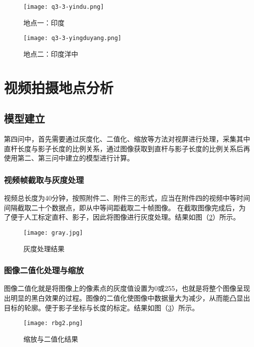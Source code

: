\documentclass[withoutpreface,bwprint]{cumcmthesis} %
\begin{document}
\begin{figure}[!htbp]  
\begin{minipage}[t]{0.5\textwidth}
\centering  
\texttt{[image: q3-3-yindu.png]}
\caption{地点一：印度} \label{fig:q3-3-yindu}\end{minipage}
\hspace{1ex}
\begin{minipage}[t]{0.5\textwidth}  
\centering  
\texttt{[image: q3-3-yingduyang.png]}
\caption{地点二：印度洋中} \label{fig:q3-3-yingduyang}
\end{minipage}  
\end{figure} 




\newpage
\section{视频拍摄地点分析}
\subsection{模型建立}
第四问中，首先需要通过灰度化、二值化、缩放等方法对视屏进行处理，采集其中直杆长度与影子长度的比例关系，通过图像获取到直杆与影子长度的比例关系后再使用第二、第三问中建立的模型进行计算。
\subsubsection{视频帧截取与灰度处理}
视频总长度为40分钟，按照附件二、附件三的形式，应当在附件四的视频中等时间间隔截取二十个数据点，即从中等间距截取二十帧图像。
在截取图像完成后，为了便于人工标定直杆、影子，因此将图像进行灰度处理。结果如图（\ref{fig:gray}）所示。

\begin{figure}[h]
\small
\centering
\texttt{[image: gray.jpg]}
\caption{灰度处理结果} \label{fig:gray}
\end{figure}
\subsubsection{图像二值化处理与缩放}
图像二值化就是将图像上的像素点的灰度值设置为0或255，也就是将整个图像呈现出明显的黑白效果的过程。图像的二值化使图像中数据量大为减少，从而能凸显出目标的轮廓。便于影子坐标与长度的标定。结果如图（\ref{fig:rgb2}）所示。

\begin{figure}[h]
\small
\centering
\texttt{[image: rbg2.png]}
\caption{缩放与二值化结果} \label{fig:rgb2}
\end{figure}
\end{document}

